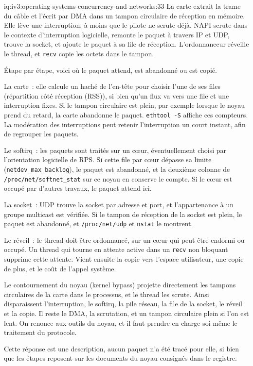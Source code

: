 \begin{solution}{iq:iv3:operating-systems-concurrency-and-networks:33}
La carte extrait la trame du câble et l'écrit par DMA dans un tampon circulaire de réception en mémoire. Elle lève une interruption, à moins que le pilote ne scrute déjà. NAPI scrute dans le contexte d'interruption logicielle, remonte le paquet à travers IP et UDP, trouve la socket, et ajoute le paquet à sa file de réception. L'ordonnanceur réveille le thread, et \texttt{recv} copie les octets dans le tampon.

Étape par étape, voici où le paquet attend, est abandonné ou est copié.

La carte~: elle calcule un haché de l'en-tête pour choisir l'une de ses files (répartition côté réception (RSS)), si bien qu'un flux va vers une file et une interruption fixes. Si le tampon circulaire est plein, par exemple lorsque le noyau prend du retard, la carte abandonne le paquet. \texttt{ethtool -S} affiche ces compteurs. La modération des interruptions peut retenir l'interruption un court instant, afin de regrouper les paquets.

Le softirq~: les paquets sont traités sur un cœur, éventuellement choisi par l'orientation logicielle de RPS. Si cette file par cœur dépasse sa limite (\texttt{netdev\_max\_backlog}), le paquet est abandonné, et la deuxième colonne de \texttt{/proc/net/softnet\_stat} sur ce noyau en conserve le compte. Si le cœur est occupé par d'autres travaux, le paquet attend ici.

La socket~: UDP trouve la socket par adresse et port, et l'appartenance à un groupe multicast est vérifiée. Si le tampon de réception de la socket est plein, le paquet est abandonné, et \texttt{/proc/net/udp} et \texttt{nstat} le montrent.

Le réveil~: le thread doit être ordonnancé, sur un cœur qui peut être endormi ou occupé. Un thread qui tourne en attente active dans un \texttt{recv} non bloquant supprime cette attente. Vient ensuite la copie vers l'espace utilisateur, une copie de plus, et le coût de l'appel système.

Le contournement du noyau (kernel bypass) projette directement les tampons circulaires de la carte dans le processus, et le thread les scrute. Ainsi disparaissent l'interruption, le softirq, la pile réseau, la file de la socket, le réveil et la copie. Il reste le DMA, la scrutation, et un tampon circulaire plein si l'on est lent. On renonce aux outils du noyau, et il faut prendre en charge soi-même le traitement du protocole.

Cette réponse est une description, aucun paquet n'a été tracé pour elle, si bien que les étapes reposent sur les documents du noyau consignés dans le registre.

\end{solution}

